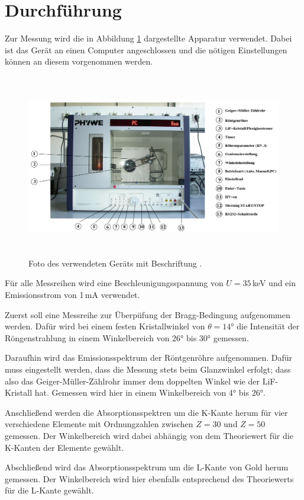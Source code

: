 \section{Durchführung}
\label{sec:Durchführung}

Zur Messung wird die in Abbildung \ref{fig:geraet} dargestellte Apparatur verwendet.
Dabei ist das Gerät an einen Computer angeschlossen und die nötigen Einstellungen
können an diesem vorgenommen werden.

\begin{figure}
  \centering
  \includegraphics[height=8cm]{data/geraet.png}
  \caption{Foto des verwendeten Geräts mit Beschriftung \cite{Versuchsanleitung}.}
  \label{fig:geraet}
\end{figure}

Für alle Messreihen wird eine Beschleunigungsspannung von $U=35\,$keV und ein
Emissionsstrom von 1\,mA verwendet.

Zuerst soll eine Messreihe zur Überpüfung der Bragg-Bedingung aufgenommen werden.
Dafür wird bei einem festen Kristallwinkel von $\theta=14°$ die Intensität der
Röngenstrahlung in einem Winkelbereich von 26° bis 30° gemessen.

Daraufhin wird das Emissionsspektrum der Röntgenröhre aufgenommen. Dafür muss eingestellt
werden, dass die Messung stets beim Glanzwinkel erfolgt; dass also das Geiger-Müller-Zählrohr
immer dem doppelten Winkel wie der LiF-Kristall hat. Gemessen wird hier in einem
Winkelbereich von 4° bis 26°.

Anschließend werden die Absorptionsspektren um die K-Kante herum für vier verschiedene
Elemente mit Ordnungzahlen zwischen $Z=30$ und $Z=50$ gemessen. Der Winkelbereich wird
dabei abhängig von dem Theoriewert für die K-Kanten der Elemente gewählt.

Abschließend wird das Absorptionsspektrum um die L-Kante von Gold herum gemessen.
Der Winkelbereich wird hier ebenfalls entsprechend des Theoriewerts für die
L-Kante gewählt.

